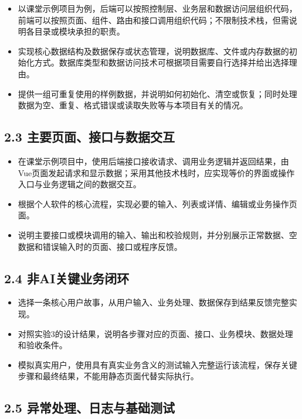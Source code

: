 \documentclass[UTF8,12pt,a4paper]{ctexart}
\begin{document}
\begin{itemize}
  \item 以课堂示例项目为例，后端可以按照控制层、业务层和数据访问层组织代码，前端可以按照页面、组件、路由和接口调用组织代码；不限制技术栈，但需说明各目录或模块承担的职责。
  \item 实现核心数据结构及数据保存或状态管理，说明数据库、文件或内存数据的初始化方式。数据库类型和数据访问技术可根据项目需要自行选择并给出选择理由。
  \item 提供一组可重复使用的样例数据，并说明如何初始化、清空或恢复；同时处理数据为空、重复、格式错误或读取失败等与本项目有关的情况。
\end{itemize}

\subsection*{2.3 主要页面、接口与数据交互}

\begin{itemize}
  \item 在课堂示例项目中，使用后端接口接收请求、调用业务逻辑并返回结果，由Vue页面发起请求和显示数据；采用其他技术栈时，应实现等价的界面或操作入口与业务逻辑之间的数据交互。
  \item 根据个人软件的核心流程，实现必要的输入、列表或详情、编辑或业务操作页面。
  \item 说明主要接口或模块调用的输入、输出和校验规则，并分别展示正常数据、空数据和错误输入时的页面、接口或程序反馈。
\end{itemize}

\subsection*{2.4 非AI关键业务闭环}

\begin{itemize}
  \item 选择一条核心用户故事，从用户输入、业务处理、数据保存到结果反馈完整实现。
  \item 对照实验3的设计结果，说明各步骤对应的页面、接口、业务模块、数据处理和验收条件。
  \item 模拟真实用户，使用具有真实业务含义的测试输入完整运行该流程，保存关键步骤和最终结果，不能用静态页面代替实际执行。
\end{itemize}

\subsection*{2.5 异常处理、日志与基础测试}
\end{document}
